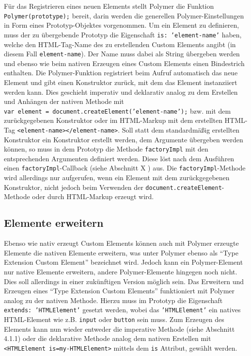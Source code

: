 Für das Registrieren eines neuen Elements stellt Polymer die Funktion \texttt{Polymer(prototype);} bereit, darin werden die generellen Polymer-Einstellungen in Form eines Prototyp-Objektes vorgenommen. Um ein Element zu definieren, muss der zu übergebende Prototyp die Eigenschaft \texttt{is: 'element-name'} haben, welche den HTML-Tag-Name des zu erstellenden Custom Elements angibt (in diesem Fall \texttt{element-name}). Der Name muss dabei als String übergeben werden und ebenso wie beim nativen Erzeugen eines Custom Elements einen Bindestrich enthalten. Die Polymer-Funktion registriert beim Aufruf automatisch das neue Element und gibt einen Konstruktor zurück, mit dem das Element instanziiert werden kann. Dies geschieht imperativ und deklarativ analog zu dem Erstellen und Anhängen der nativen Methode mit \texttt{var\ element\ =\ document.createElement('element-name');} bzw. mit dem zurückgegebenen Konstruktor oder im HTML-Markup mit dem erstellten HTML-Tag \texttt{\textless{}element-name\textgreater{}\textless{}/element-name\textgreater{}}. Soll statt dem standardmäßig erstellten Konstruktor ein Konstruktor erstellt werden, dem Argumente übergeben werden können, so muss in dem Prototyp die Methode \texttt{factoryImpl} mit den entsprechenden Argumenten definiert werden. Diese löst nach dem Ausführen einen \texttt{factoryImpl}-Callback (siehe Abschnitt X ) aus. Die \texttt{factoryImpl}-Methode wird allerdings nur aufgerufen, wenn ein Element mit dem zurückgegebenen Konstruktor, nicht jedoch beim Verwenden der \texttt{document.createElement}-Methode oder durch HTML-Markup erzeugt wird.


\subsection{Elemente erweitern}\label{elemente-erweitern}

Ebenso wie nativ erzeugt Custom Elements können auch mit Polymer erzeugte Elemente die nativen Elemente erweitern, was unter Polymer ebenso als ``Type Extension Custom Element'' bezeichnet wird. Jedoch kann ein Polymer-Element nur native Elemente erweitern, andere Polymer-Elemente hingegen noch nicht. Dies soll allerdings in einer zukünftigen Version möglich sein. Das Erweitern und Erzeugen eines ``Type Extension Custom Elements'' funktioniert mit Polymer analog zu der nativen Methode. Hierzu muss im Prototyp die Eigenschaft \texttt{extends:\ 'HTMLElement'} gesetzt werden, wobei das \texttt{'HTMLElement'} ein natives HTML-Element wie z.B. \texttt{input} oder \texttt{button} sein muss. Zum Erzeugen des Elements kann nun wieder entweder die imperative Methode (siehe Abschnitt 4.1.1) oder die deklarative Methode analog dem nativen Erstellen mit \texttt{\textless{}HTMLElement\ is=\dq my-HTMLElement\dq\textgreater{}} mittels dem \texttt{is} Attribut, gewählt werden.


